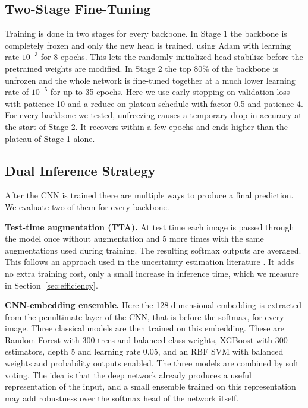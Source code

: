 \documentclass[11pt]{article}
\begin{document}
\subsection{Two-Stage Fine-Tuning}
\label{sec:finetuning}
Training is done in two stages for every backbone. In Stage 1 the backbone is completely frozen and only the new head is trained, using Adam \cite{kingma2015adam} with learning rate $10^{-3}$ for 8 epochs. This lets the randomly initialized head stabilize before the pretrained weights are modified. In Stage 2 the top 80\% of the backbone is unfrozen and the whole network is fine-tuned together at a much lower learning rate of $10^{-5}$ for up to 35 epochs. Here we use early stopping on validation loss with patience 10 and a reduce-on-plateau schedule with factor 0.5 and patience 4. For every backbone we tested, unfreezing causes a temporary drop in accuracy at the start of Stage 2. It recovers within a few epochs and ends higher than the plateau of Stage 1 alone.

\subsection{Dual Inference Strategy}
\label{sec:inference}
After the CNN is trained there are multiple ways to produce a final prediction. We evaluate two of them for every backbone.

\textbf{Test-time augmentation (TTA).} At test time each image is passed through the model once without augmentation and 5 more times with the same augmentations used during training. The resulting softmax outputs are averaged. This follows an approach used in the uncertainty estimation literature \cite{wang2019tta}. It adds no extra training cost, only a small increase in inference time, which we measure in Section~\ref{sec:efficiency}.

\textbf{CNN-embedding ensemble.} Here the 128-dimensional embedding is extracted from the penultimate layer of the CNN, that is before the softmax, for every image. Three classical models are then trained on this embedding. These are Random Forest \cite{breiman2001randomforests} with 300 trees and balanced class weights, XGBoost \cite{chen2016xgboost} with 300 estimators, depth 5 and learning rate 0.05, and an RBF SVM with balanced weights and probability outputs enabled. The three models are combined by soft voting. The idea is that the deep network already produces a useful representation of the input, and a small ensemble trained on this representation may add robustness over the softmax head of the network itself.
\end{document}
